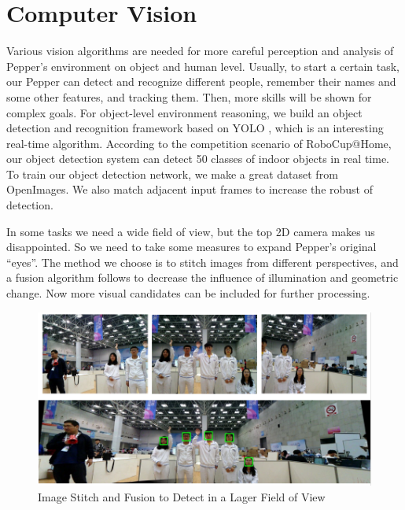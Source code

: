 \section{Computer Vision}
\label{sec:vision}
Various vision algorithms are needed for more careful perception and analysis of Pepper’s environment on object and human level. 
Usually, to start a certain task, our Pepper can detect and recognize different people, remember their names and some other features, and tracking them. 
Then, more skills will be shown for complex goals.  
For object-level environment reasoning, we build an object detection and recognition framework based on YOLO \cite{Redmon2018YOLOv3AI}, which is an interesting real-time algorithm. 
According to the competition scenario of RoboCup@Home, our object detection system can detect 50 classes of indoor objects in real time. 
To train our object detection network, we make a great dataset from OpenImages. 
We also match adjacent input frames to increase the robust of detection.

In some tasks we need a wide field of view, but the top 2D camera makes us disappointed. 
So we need to take some measures to expand Pepper’s original “eyes”. 
The method we choose is to stitch images from different perspectives, and a fusion algorithm follows to decrease the influence of illumination and geometric change. 
Now more visual candidates can be included for further processing.
\begin{figure}[h!]
\centering
\includegraphics[width=1.\textwidth]{figs/vision1.png}
\caption{Image Stitch and Fusion to Detect in a Lager Field of View}
\label{fig:vision1}
\end{figure}

